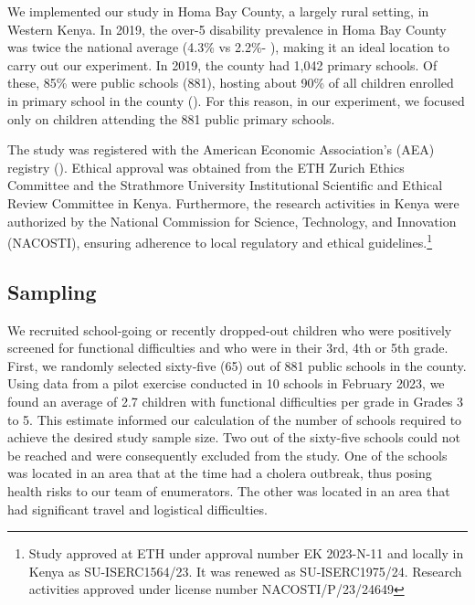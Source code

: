 \documentclass[hidelinks,12pt]{article}
\begin{document}
\begin{singlespace}
We implemented our study in Homa Bay County, a largely rural setting, in Western Kenya. In 2019, the over-5 disability prevalence in Homa Bay County was twice the national average (4.3\% vs 2.2\%- \textcite{kenya_national_bureau_of_statistics_2019_2020}), making it an ideal location to carry out our experiment. In 2019, the county had 1,042 primary schools. Of these, 85\% were public schools (881), hosting about 90\% of all children enrolled in primary school in the county (\cite{government_of_kenya_basic_2019}). For this reason, in our experiment, we focused only on children attending the 881 public primary schools. 

The study was registered with the American Economic Association’s (AEA) registry (\cite{odhiambo_does_2023}). Ethical approval was obtained from the ETH Zurich Ethics Committee and the Strathmore University Institutional Scientific and Ethical Review Committee in Kenya. Furthermore, the research activities in Kenya were authorized by the National Commission for Science, Technology, and Innovation (NACOSTI), ensuring adherence to local regulatory and ethical guidelines.\footnote{Study approved at ETH under approval number EK 2023-N-11 and locally in Kenya as SU-ISERC1564/23. It was renewed as SU-ISERC1975/24. Research activities approved under license number NACOSTI/P/23/24649}

\subsection{Sampling}\label{subsec:sampling}
We recruited school-going or recently dropped-out children who were positively screened for functional difficulties and who were in their 3rd, 4th or 5th grade. First, we randomly selected sixty-five (65) out of 881 public schools in the county. Using data from a pilot exercise conducted in 10 schools in February 2023, we found an average of 2.7 children with functional difficulties per grade in Grades 3 to 5. This estimate informed our calculation of the number of schools required to achieve the desired study sample size. Two out of the sixty-five schools could not be reached and were consequently excluded from the study. One of the schools was located in an area that at the time had a cholera outbreak, thus posing health risks to our team of enumerators. The other was located in an area that had significant travel and logistical difficulties. 


\end{singlespace}
\end{document}
